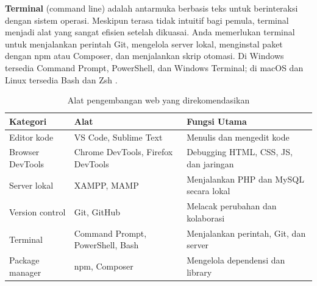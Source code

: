 \textbf{Terminal} (command line) adalah antarmuka berbasis teks untuk berinteraksi dengan sistem operasi. Meskipun terasa tidak intuitif bagi pemula, terminal menjadi alat yang sangat efisien setelah dikuasai. Anda memerlukan terminal untuk menjalankan perintah Git, mengelola server lokal, menginstal paket dengan npm atau Composer, dan menjalankan skrip otomasi. Di Windows tersedia Command Prompt, PowerShell, dan Windows Terminal; di macOS dan Linux tersedia Bash dan Zsh \cite{mdnToolsTesting}.

\begin{table}[htbp]
\centering
\begin{tabular}{|P{3.5cm}|P{3.5cm}|P{4.5cm}|}
\hline
\textbf{Kategori} & \textbf{Alat} & \textbf{Fungsi Utama} \\
\hline
Editor kode & VS Code, Sublime Text & Menulis dan mengedit kode \\
\hline
Browser DevTools & Chrome DevTools, Firefox DevTools & Debugging HTML, CSS, JS, dan jaringan \\
\hline
Server lokal & XAMPP, MAMP & Menjalankan PHP dan MySQL secara lokal \\
\hline
Version control & Git, GitHub & Melacak perubahan dan kolaborasi \\
\hline
Terminal & Command Prompt, PowerShell, Bash & Menjalankan perintah, Git, dan server \\
\hline
Package manager & npm, Composer & Mengelola dependensi dan library \\
\hline
\end{tabular}
\caption{Alat pengembangan web yang direkomendasikan}
\end{table}

